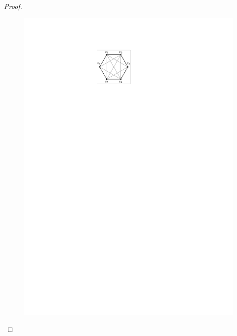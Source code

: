 \begin{proof}
\begin{figure}[t!]
    \centering
    \begin{minipage}[b]{.16\textwidth}
        \centering
        \includegraphics[width=\textwidth,page=1]{images/polygon_conf}
        \subcaption{~}\label{fig:6gon}
    \end{minipage}
    \begin{minipage}[b]{.16\textwidth}
        \centering

\end{minipage}
\end{figure}
\end{proof}
